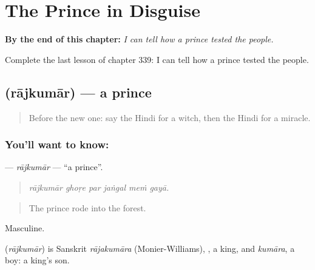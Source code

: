 
\chapter{The Prince in Disguise}
\label{ch:hi-the-prince-in-disguise}

\begin{chapteropening}
\textbf{By the end of this chapter:} \emph{I can tell how a prince tested the people.}

Complete the last lesson of chapter 339: I can tell how a prince tested the people.
\end{chapteropening}

\section[\texorpdfstring{\hi{राजकुमार} (rājkumār)}{राजकुमार (rājkumār)}]{ (rājkumār) — a prince}

\label{lesson:HI-C339-rajkumar}



\begin{quote}
Before the new one: say the Hindi for a witch, then the Hindi for a miracle.
\end{quote}

\subsection*{You'll want to know: }
\textbf{} — \emph{rājkumār} — \textquotedblleft{}a prince\textquotedblright{}.

\begin{quote}
     
\end{quote}

\begin{quote}
\emph{rājkumār ghoṛe par jaṅgal meṁ gayā.}
\end{quote}

\begin{quote}
The prince rode into the forest.
\end{quote}

Masculine.

\begin{cousinweb}
\textbf{} (\emph{rājkumār}) is Sanskrit \emph{rājakumāra} (Monier-Williams), \textbf{}, a king, and \emph{kumāra}, a boy: a king's son.
\end{cousinweb}

